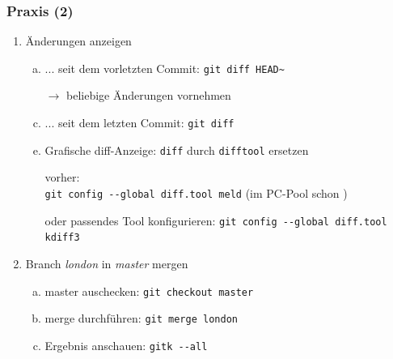 \documentclass{beamer}
\begin{document}
\begin{frame}[fragile,label=uebung20]
\frametitle{Praxis (2)}
\begin{enumerate}
 \setcounter{enumi}{\value{taskcounter}}

 \item Änderungen anzeigen
 \begin{enumerate}[a)]
  \item ... seit dem vorletzten Commit: \verb|git diff HEAD~|
  \item[$\rightarrow$] beliebige Änderungen vornehmen
  \item ... seit dem letzten Commit: \verb|git diff|
  \item[]
  \item Grafische diff-Anzeige: \verb|diff| durch \verb|difftool| ersetzen
  \item[] vorher:\\
  \verb|git config --global diff.tool meld| {(\tiny im PC-Pool schon \checkmark)}
  \item[] oder passendes Tool konfigurieren: \verb|git config --global diff.tool kdiff3|
  \end{enumerate}
  \item Branch \textit{london} in \textit{master} mergen
  \begin{enumerate}[a)]
   \item master auschecken: \verb|git checkout master|
   \item merge durchführen: \verb|git merge london|
   \item Ergebnis anschauen: \verb|gitk --all|
  \end{enumerate}

 \setcounter{taskcounter}{\value{enumi}}
\end{enumerate}



\end{frame}


\end{document}
